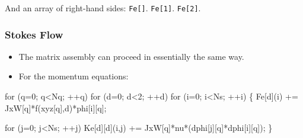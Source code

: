 \begin{frame}[t]
\begin{block}{}
\begin{itemize}
{                { 	  And an array of right-hand sides: }
 	\only<5> {\texttt{Fe[]}.}
	\only<6> {\hspace{-0.05in}\texttt{Fe[\alert{1}]}.}
	\only<7> {\hspace{-0.1in}\texttt{Fe[\alert{2}]}.}
	}

	

    \end{itemize}
  \end{block}
\end{frame}




\begin{frame}[fragile]  %
  \frametitle{Stokes Flow}
  \begin{block}{}
    \begin{itemize}    
    \item{The matrix assembly can proceed in essentially the same way.}
    \item{For the momentum equations:}
    \end{itemize}
  \end{block}
  \small
\begin{semiverbatim}
for (q=0; q<Nq; ++q) 
  \alert{for (d=0; d<2; ++d)}
    for (i=0; i<Ns; ++i) \{
      Fe\alert{[d]}(i) += JxW[q]*f(xyz[q],\alert{d})*phi[i][q];
      
      for (j=0; j<Ns; ++j)
        Ke\alert{[d][d]}(i,j) +=
	            JxW[q]*\alert{nu}*(dphi[j][q]*dphi[i][q]);
    \}
\end{semiverbatim}
\end{frame}
